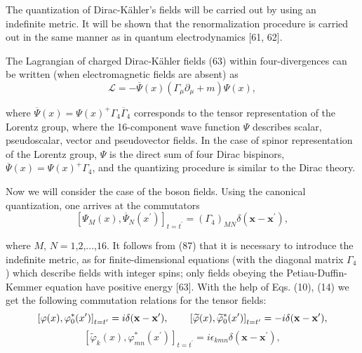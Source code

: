\documentclass[a4paper,12pt]{article}
\begin{document}
The quantization of Dirac-K\"ahler's fields will be carried out by using an
indefinite metric. It will be shown that the renormalization procedure is
carried out in the same manner as in quantum electrodynamics [61, 62].

The Lagrangian of charged Dirac-K\"ahler fields (63) within four-divergences
can be written (when electromagnetic fields are absent) as
\begin{equation}
\mathcal{L}=-\overline{\Psi }(x)\left( \Gamma _\mu \partial _\mu
+m\right) \Psi (x) , \label{86}
\end{equation}

where $\overline{\Psi }(x)=\Psi (x)^{+}\Gamma _4\overline{\Gamma
}_4$ corresponds to the tensor representation of the Lorentz
group, where the 16-component wave function $\Psi $ describes
scalar, pseudoscalar, vector and pseudovector fields. In the case
of spinor representation of the Lorentz group, $\Psi $ is the
direct sum of four Dirac bispinors, $\overline{\Psi } (x)=\Psi
(x)^{+}\Gamma _4$, and the quantizing procedure is similar to the
Dirac theory.

Now we will consider the case of the boson fields. Using the canonical
quantization, one arrives at the commutators
\begin{equation}
\left[ \Psi _M(x),\overline{\Psi }_N(x^{\prime })\right]
_{t=t^{\prime }}=\left( \Gamma _4\right) _{MN}\delta
(\mathbf{x}-\mathbf{x}^{\prime }) ,\label{87}
\end{equation}

where $M$, $N=1$,$2$,...,$16$. It follows from (87) that it is
necessary to introduce the indefinite metric, as for
finite-dimensional equations (with the diagonal matrix $\Gamma
_4$) which describe fields with integer spins; only fields obeying
the Petiau-Duffin-Kemmer equation have positive energy [63]. With
the help of Eqs. (10), (14) we get the following commutation
relations for the tensor fields:
\[
\left[ \varphi (x),\varphi _0^{*}(x^{\prime })\right]
_{t=t^{\prime }}=i\delta (\mathbf{x}-\mathbf{x}^{\prime }) ,
\hspace{0.3in}\left[ \widetilde{ \varphi }(x),\widetilde{\varphi
}_0^{*}(x^{\prime })\right] _{t=t^{\prime }}=-i\delta
(\mathbf{x}-\mathbf{x}^{\prime }) ,
\]
\begin{equation}
\left[ \widetilde{\varphi }_k(x),\varphi _{mn}^{*}(x^{\prime
})\right] _{t=t^{\prime }}=i\epsilon _{kmn}\delta
(\mathbf{x}-\mathbf{x}^{\prime }) ,\label{88}
\end{equation}
\end{document}
